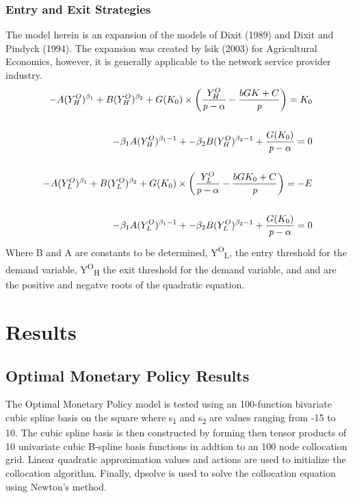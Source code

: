 \documentclass[a4paper,oneside]{article}
\begin{document}
\subsubsection{Entry and Exit Strategies}
	The model herein is an expansion of the models of Dixit (1989) and Dixit and Pindyck (1994). 
The expansion was created by lsik (2003) for Agricultural Economics, however, it is generally applicable to the network service provider industry.
\begin{equation}
	\begin{split}
		-A(Y^O_H)^{\beta_1} + B(Y^O_H)^{\beta_2}  + G(K_0) \times \bigg( \frac{Y^O_H}{\emph{p}-\alpha} -  \frac{bG{K}+C}{\emph{p}}    \bigg) =K_0 
		\\
		\\
		-\beta_1 A (Y^O_H)^{\beta_1-1} + -\beta_2 B (Y^O_H)^{\beta_2-1}  + \frac{G(K_0)}{\emph{p}-\alpha} = 0 
		\\
		\\
		-A(Y^O_L)^{\beta_1} + B(Y^O_L)^{\beta_2} + G(K_0) \times \bigg( \frac{Y^O_L}{\emph{p}-\alpha} -  \frac{bG{K_0}+C}{\emph{p}}    \bigg) = -E
		\\
		\\
		-\beta_1 A (Y^O_L)^{\beta_1-1} + -\beta_2 B (Y^O_L)^{\beta_2-1}  + \frac{G(K_0)}{\emph{p}-\alpha} = 0
	\end{split}
\end{equation}
Where B and A are constants to be determined, Y\textsuperscript{O}\textsubscript{L}, the entry threshold for the demand variable, Y\textsuperscript{O}\textsubscript{H} the exit threshold for the demand variable, and 
\textbeta{} and \textbeta{} are the positive and negatve roots of the quadratic equation. 
\section{Results}\label{sec:res}
\subsection{Optimal Monetary Policy Results}
\:\:\:\:\:\: The Optimal Monetary Policy model is tested using an 100-function bivariate cubic spline basis on the square where s\textsubscript{1} and s\textsubscript{2} are values ranging from -15 to 10. 
The cubic spline basis is then constructed by forming then tensor products of 10 univariate cubic B-spline basis functions in addtion to an 100 node collocation grid.
Linear quadratic approximation values and actions are used to initialize the collocation algorithm. 
Finally, dpsolve is used to solve the collocation equation using Newton's method.
\end{document}
